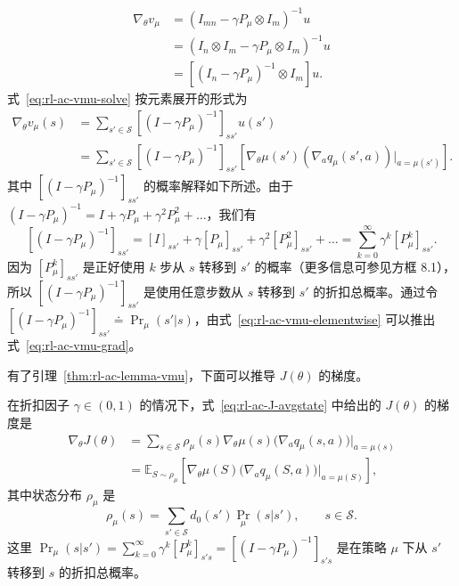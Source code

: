 \begin{derivation}
\begin{equation}
\begin{aligned}
\nabla_{\theta} v_{\mu} &= (I_{mn} - \gamma P_{\mu} \otimes I_{m})^{-1} u \\
&= (I_{n} \otimes I_{m} - \gamma P_{\mu} \otimes I_{m})^{-1} u \\
&= \left[ (I_{n} - \gamma P_{\mu})^{-1} \otimes I_{m} \right] u.
\end{aligned}
\label{eq:rl-ac-vmu-solve}
\end{equation}
式~\eqref{eq:rl-ac-vmu-solve} 按元素展开的形式为
\begin{equation}
\begin{aligned}
\nabla_{\theta} v_{\mu}(s) &= \sum_{s' \in \mathcal{S}} \left[ (I - \gamma P_{\mu})^{-1} \right]_{ss'} u(s') \\
&= \sum_{s' \in \mathcal{S}} \left[ (I - \gamma P_{\mu})^{-1} \right]_{ss'} \left[ \nabla_{\theta} \mu(s') (\nabla_{a} q_{\mu}(s', a)) |_{a = \mu(s')} \right].
\end{aligned}
\label{eq:rl-ac-vmu-elementwise}
\end{equation}
其中 $\left[ (I - \gamma P_{\mu})^{-1} \right]_{ss'}$ 的概率解释如下所述。由于 $(I - \gamma P_{\mu})^{-1} = I + \gamma P_{\mu} + \gamma^{2} P_{\mu}^{2} + \dots$，我们有
\[
\left[ (I - \gamma P_{\mu})^{-1} \right]_{ss'} = [I]_{ss'} + \gamma [P_{\mu}]_{ss'} + \gamma^{2} [P_{\mu}^{2}]_{ss'} + \dots = \sum_{k=0}^{\infty} \gamma^{k} [P_{\mu}^{k}]_{ss'}.
\]
因为 $[P_{\mu}^{k}]_{ss'}$ 是正好使用 $k$ 步从 $s$ 转移到 $s'$ 的概率（更多信息可参见方框 8.1），所以 $\left[ (I - \gamma P_{\mu})^{-1} \right]_{ss'}$ 是使用任意步数从 $s$ 转移到 $s'$ 的折扣总概率。通过令 $\left[ (I - \gamma P_{\mu})^{-1} \right]_{ss'} \doteq \operatorname{Pr}_{\mu}(s' | s)$，由式~\eqref{eq:rl-ac-vmu-elementwise} 可以推出式~\eqref{eq:rl-ac-vmu-grad}。
\end{derivation}

有了引理~\ref{thm:rl-ac-lemma-vmu}，下面可以推导 $J(\theta)$ 的梯度。

\begin{theorem}[有折扣的情况下的确定性策略梯度定理（定理 10.3）]\label{thm:rl-ac-dpg-discounted}
在折扣因子 $\gamma \in (0, 1)$ 的情况下，式~\eqref{eq:rl-ac-J-avgstate} 中给出的 $J(\theta)$ 的梯度是
\begin{equation}
\begin{aligned}
\nabla_{\theta} J(\theta) &= \sum_{s \in \mathcal{S}} \rho_{\mu}(s) \nabla_{\theta} \mu(s) \big( \nabla_{a} q_{\mu}(s, a) \big) |_{a = \mu(s)} \\
&= \mathbb{E}_{S \sim \rho_{\mu}} \left[ \nabla_{\theta} \mu(S) \big( \nabla_{a} q_{\mu}(S, a) \big) |_{a = \mu(S)} \right],
\end{aligned}
\label{eq:rl-ac-dpg-discounted}
\end{equation}
其中状态分布 $\rho_{\mu}$ 是
\[
\rho_{\mu}(s) = \sum_{s' \in \mathcal{S}} d_{0}(s') \operatorname{Pr}_{\mu}(s | s'), \qquad s \in \mathcal{S}.
\]
这里 $\operatorname{Pr}_{\mu}(s | s') = \sum_{k=0}^{\infty} \gamma^{k} [P_{\mu}^{k}]_{s's} = \left[ (I - \gamma P_{\mu})^{-1} \right]_{s's}$ 是在策略 $\mu$ 下从 $s'$ 转移到 $s$ 的折扣总概率。
\end{theorem}

